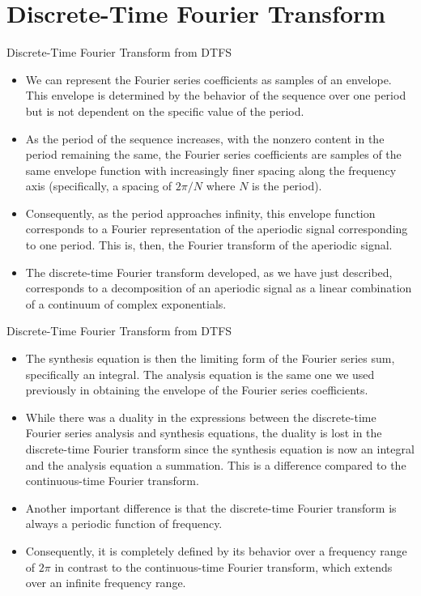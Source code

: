 \section{Discrete-Time Fourier Transform}

\begin{frame}{Discrete-Time Fourier Transform from DTFS}
    \begin{itemize}[<+->]
        \item We can represent the Fourier series coefficients as samples of an envelope. This envelope is determined by the behavior of the sequence over one period but is not dependent on the specific value of the period.
        \item As the period of the sequence increases, with the nonzero content in the period remaining the same, the Fourier series coefficients are samples of the same envelope function with increasingly finer spacing along the frequency axis (specifically, a spacing of $2\pi/N$ where $N$ is the period).
        \item Consequently, as the period approaches infinity, this envelope function corresponds to a Fourier representation of the aperiodic signal corresponding to one period. This is, then, the Fourier transform of the aperiodic signal.
        \item The discrete-time Fourier transform developed, as we have just described, corresponds to a decomposition of an aperiodic signal as a linear combination of a continuum of complex exponentials.
    \end{itemize}
\end{frame}


\begin{frame}{Discrete-Time Fourier Transform from DTFS}
    \begin{itemize}
        \item The synthesis equation is then the limiting form of the Fourier series sum, specifically an integral. The analysis equation is the same one we used previously in obtaining the envelope of the Fourier series coefficients.
        \item While there was a duality in the expressions between the discrete-time Fourier series analysis and synthesis equations, the duality is lost in the discrete-time Fourier transform since the synthesis equation is now an integral and the analysis equation a summation. This is a difference compared to the continuous-time Fourier transform.
        \item Another important difference is that the discrete-time Fourier transform is always a periodic function of frequency.
        \item Consequently, it is completely defined by its behavior over a frequency range of $2\pi$ in contrast to the continuous-time Fourier transform, which extends over an infinite frequency range.
    \end{itemize}
\end{frame}

